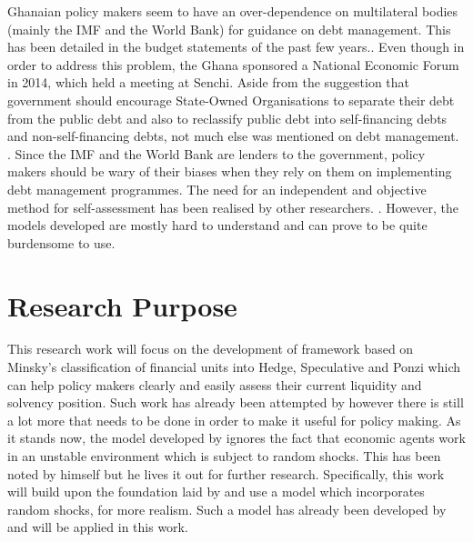 \documentclass[a4paper, 12pt]{article}
\begin{document}
	
	Ghanaian policy makers seem to have an over-dependence on multilateral bodies (mainly the IMF and the World Bank) for guidance on debt management. This has been detailed in the budget statements of the past few years.\cite{Ken2017,Ken2017nov,Terkper2015}. Even though in order to address this problem, the Ghana sponsored a National Economic Forum in 2014, which held a meeting at Senchi. Aside from the suggestion that government should encourage State-Owned Organisations to separate their debt from the public debt and also to reclassify public debt into self-financing debts and non-self-financing debts, not much else was mentioned on debt management. \cite{NEF2014}. Since the IMF and the World Bank are lenders to the government, policy makers should be wary of their biases when they rely on them on implementing debt management programmes. The need for an independent and objective method for self-assessment has been realised by other researchers. \cite{Ana-Mari-2007, Marc-2008}. However, the models developed are mostly hard to understand and can prove to be quite burdensome to use.
	
	
	\section{Research Purpose}
	This research work will focus on the development of framework based on Minsky's classification of financial units into Hedge, Speculative and Ponzi which can help policy makers clearly and easily assess their current liquidity and solvency position. Such work has already been attempted by  however there is still a lot more that needs to be done in order to make it useful for policy making. As it stands now, the model developed by  ignores the fact that economic agents work in an unstable environment which is subject to random shocks. This has been noted by   himself but he lives it out for further research. Specifically, this work will build upon the foundation laid by  and use a model which incorporates random shocks, for more realism. Such a model has already been developed by  and will be applied in this work.
	
\end{document}
